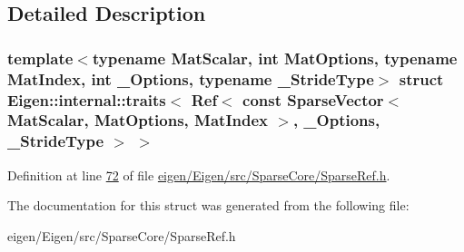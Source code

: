 \subsection{Detailed Description}
\subsubsection*{template$<$typename Mat\+Scalar, int Mat\+Options, typename Mat\+Index, int \+\_\+\+Options, typename \+\_\+\+Stride\+Type$>$\newline
struct Eigen\+::internal\+::traits$<$ Ref$<$ const Sparse\+Vector$<$ Mat\+Scalar, Mat\+Options, Mat\+Index $>$, \+\_\+\+Options, \+\_\+\+Stride\+Type $>$ $>$}



Definition at line \hyperlink{eigen_2_eigen_2src_2_sparse_core_2_sparse_ref_8h_source_l00072}{72} of file \hyperlink{eigen_2_eigen_2src_2_sparse_core_2_sparse_ref_8h_source}{eigen/\+Eigen/src/\+Sparse\+Core/\+Sparse\+Ref.\+h}.



The documentation for this struct was generated from the following file\+:\begin{DoxyCompactItemize}
\item 
eigen/\+Eigen/src/\+Sparse\+Core/\+Sparse\+Ref.\+h\end{DoxyCompactItemize}
